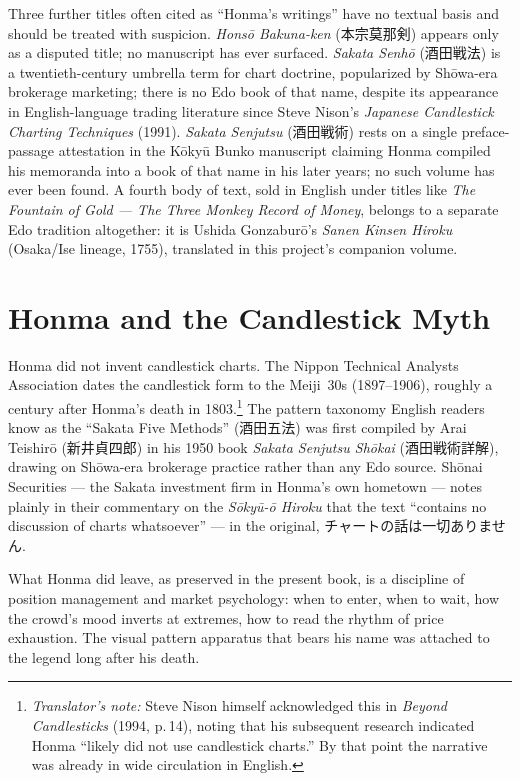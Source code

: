 \documentclass[10pt, openany]{book}
\newcommand{\jp}[1]{{\japanesefont #1}}
\newcommand{\tn}[1]{\footnote{\textit{Translator's note:} #1}}
\begin{document}
Three further titles often cited as ``Honma's writings'' have no
textual basis and should be treated with suspicion. \textit{Hons\=o
Bakuna-ken} (\jp{本宗莫那剣}) appears only as a disputed title; no
manuscript has ever surfaced. \textit{Sakata Senh\=o}
(\jp{酒田戦法}) is a twentieth-century umbrella term for chart
doctrine, popularized by Sh\=owa-era brokerage marketing; there is
no Edo book of that name, despite its appearance in
English-language trading literature since Steve Nison's
\textit{Japanese Candlestick Charting Techniques} (1991).
\textit{Sakata Senjutsu} (\jp{酒田戦術}) rests on a single
preface-passage attestation in the K\=oky\=u Bunko manuscript
claiming Honma compiled his memoranda into a book of that name in
his later years; no such volume has ever been found. A fourth body
of text, sold in English under titles like \textit{The Fountain of
Gold --- The Three Monkey Record of Money}, belongs to a separate
Edo tradition altogether: it is Ushida Gonzabur\=o's
\textit{Sanen Kinsen Hiroku} (Osaka/Ise lineage, 1755), translated
in this project's companion volume.

\section*{Honma and the Candlestick Myth}

\begin{sloppypar}
Honma did not invent candlestick charts. The Nippon Technical
Analysts Association dates the candlestick form to the Meiji~30s
(1897--1906), roughly a century after Honma's death in 1803.\tn{Steve
Nison himself acknowledged this in \textit{Beyond Candlesticks}
(1994, p.\,14), noting that his subsequent research indicated Honma
``likely did not use candlestick charts.'' By that point the
narrative was already in wide circulation in English.} The pattern
taxonomy English readers know as the ``Sakata Five Methods''
(\jp{酒田五法}) was first compiled by Arai Teishir\=o
(\jp{新井貞四郎}) in his 1950 book \textit{Sakata Senjutsu Sh\=okai}
(\jp{酒田戦術詳解}), drawing on Sh\=owa-era brokerage practice
rather than any Edo source. Sh\=onai Securities --- the Sakata
investment firm in Honma's own hometown --- notes plainly in their
commentary on the \textit{S\=oky\=u-\=o Hiroku} that the text
``contains no discussion of charts whatsoever'' --- in the original,
\jp{チャートの話は一切ありません}.
\end{sloppypar}

What Honma did leave, as preserved in the present book, is a
discipline of position management and market psychology: when to
enter, when to wait, how the crowd's mood inverts at extremes, how
to read the rhythm of price exhaustion. The visual pattern apparatus
that bears his name was attached to the legend long after his
death.
\end{document}
